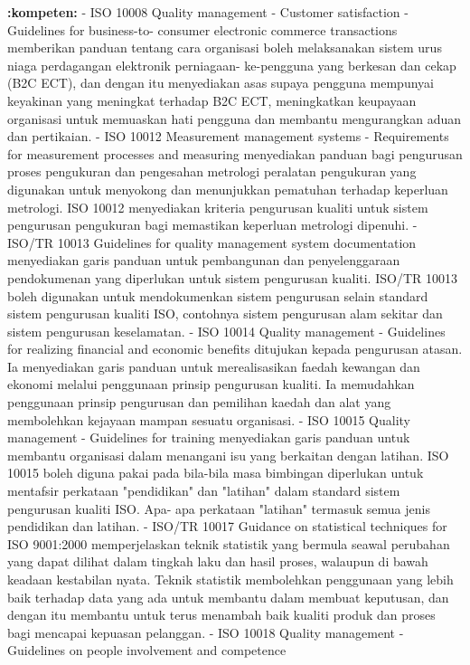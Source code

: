 \documentclass{article}
\begin{document}
\textbf{:kompeten:} - ISO 10008 Quality management - Customer satisfaction - Guidelines for business-to-
 consumer electronic commerce transactions memberikan panduan tentang cara
 organisasi boleh melaksanakan sistem urus niaga perdagangan elektronik perniagaan-
 ke-pengguna yang berkesan dan cekap (B2C ECT), dan dengan itu menyediakan asas
 supaya pengguna mempunyai keyakinan yang meningkat terhadap B2C ECT,
 meningkatkan keupayaan organisasi untuk memuaskan hati pengguna dan membantu
 mengurangkan aduan dan pertikaian.
- ISO 10012 Measurement management systems - Requirements for measurement
 processes and measuring menyediakan panduan bagi pengurusan proses pengukuran
 dan pengesahan metrologi peralatan pengukuran yang digunakan untuk menyokong dan
 menunjukkan pematuhan terhadap keperluan metrologi. ISO 10012 menyediakan kriteria
 pengurusan kualiti untuk sistem pengurusan pengukuran bagi memastikan keperluan
 metrologi dipenuhi.
- ISO/TR 10013 Guidelines for quality management system documentation menyediakan
 garis panduan untuk pembangunan dan penyelenggaraan pendokumenan yang
 diperlukan untuk sistem pengurusan kualiti. ISO/TR 10013 boleh digunakan untuk
 mendokumenkan sistem pengurusan selain standard sistem pengurusan kualiti
 ISO, contohnya sistem pengurusan alam sekitar dan sistem pengurusan keselamatan.
- ISO 10014 Quality management - Guidelines for realizing financial and economic
 benefits ditujukan kepada pengurusan atasan. Ia menyediakan garis panduan untuk
 merealisasikan faedah kewangan dan ekonomi melalui penggunaan prinsip pengurusan
 kualiti. Ia memudahkan penggunaan prinsip pengurusan dan pemilihan kaedah dan alat
 yang membolehkan kejayaan mampan sesuatu organisasi.
- ISO 10015 Quality management - Guidelines for training menyediakan garis panduan
 untuk membantu organisasi dalam menangani isu yang berkaitan dengan latihan. ISO
 10015 boleh diguna pakai pada bila-bila masa bimbingan diperlukan untuk mentafsir
 perkataan "pendidikan" dan "latihan" dalam standard sistem pengurusan kualiti ISO. Apa-
 apa perkataan "latihan" termasuk semua jenis pendidikan dan latihan.
- ISO/TR 10017 Guidance on statistical techniques for ISO 9001:2000 memperjelaskan
 teknik statistik yang bermula seawal perubahan yang dapat dilihat dalam tingkah laku dan
 hasil proses, walaupun di bawah keadaan kestabilan nyata. Teknik statistik
 membolehkan penggunaan yang lebih baik terhadap data yang ada untuk membantu
 dalam membuat keputusan, dan dengan itu membantu untuk terus menambah baik kualiti
 produk dan proses bagi mencapai kepuasan pelanggan.
- ISO 10018 Quality management - Guidelines on people involvement and competence
\end{document}
